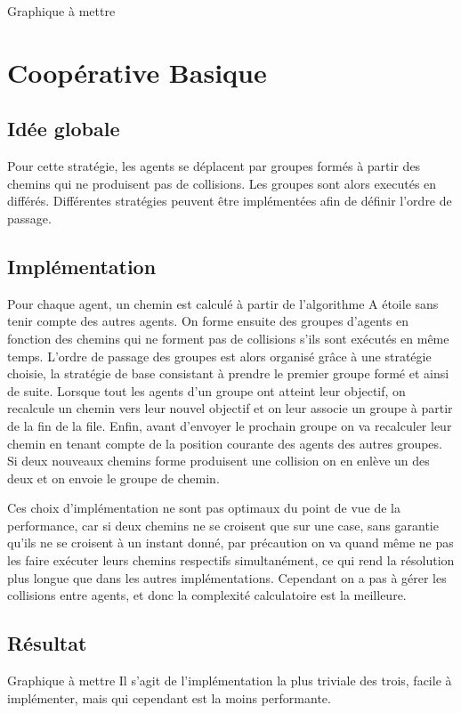 \documentclass{article}
\begin{document}
			Graphique à mettre
			
		\section{Coopérative Basique}
		
			\subsection{Idée globale}
			Pour cette stratégie, les agents se déplacent par groupes formés à partir des chemins qui ne produisent pas de collisions. Les groupes sont alors executés en différés. Différentes stratégies peuvent être implémentées afin de définir l'ordre de passage.
		
			\subsection{Implémentation}
			Pour chaque agent, un chemin est calculé à partir de l'algorithme A étoile sans tenir compte des autres agents. On forme ensuite des groupes d'agents en fonction des chemins qui ne forment pas de collisions s'ils sont exécutés en même temps. L'ordre de passage des groupes est alors organisé grâce à une stratégie choisie, la stratégie de base consistant à prendre le premier groupe formé et ainsi de suite. Lorsque tout les agents d'un groupe ont atteint leur objectif, on recalcule un chemin vers leur nouvel objectif et on leur associe un groupe à partir de la fin de la file.
			Enfin, avant d'envoyer le prochain groupe on va recalculer leur chemin en tenant compte de la position courante des agents des autres groupes. Si deux nouveaux chemins forme produisent une collision on en enlève un des deux et on envoie le groupe de chemin.
			
			Ces choix d'implémentation ne sont pas optimaux du point de vue de la performance, car si deux chemins ne se croisent que sur une case, sans garantie qu'ils ne se croisent à un instant donné, par précaution on va quand même ne pas les faire exécuter leurs chemins respectifs simultanément, ce qui rend la résolution plus longue que dans les autres implémentations. Cependant on a pas à gérer les collisions entre agents, et donc la complexité calculatoire est la meilleure.
			
			\subsection{Résultat}
			Graphique à mettre
			 Il s'agit de l'implémentation la plus triviale des trois, facile à implémenter, mais qui cependant est la moins performante.
		
\end{document}
